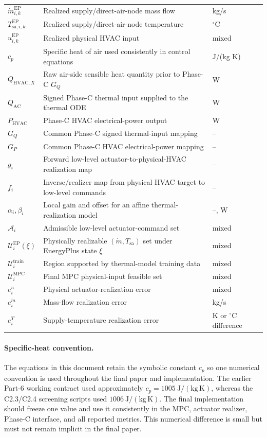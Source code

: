 \documentclass[11pt]{article}
\newcommand{\mdot}{\dot m}
\newcommand{\Qx}{Q_{\mathrm{HVAC},X}}
\newcommand{\Qac}{Q_{\mathrm{AC}}}
\newcommand{\Phvac}{P_{\mathrm{HVAC}}}
\begin{document}
\begin{longtable}{>{\raggedright\arraybackslash}p{}
                  >{\raggedright\arraybackslash}p{}
                  >{\raggedright\arraybackslash}p{}}
$\mdot_{i,k}^{\mathrm{EP}}$ & Realized supply/direct-air-node mass flow & kg/s \\
$T_{\mathrm{sa},i,k}^{\mathrm{EP}}$ & Realized supply/direct-air-node temperature & $^\circ$C \\
$u_{i,k}^{\mathrm{EP}}$ & Realized physical HVAC input & mixed \\
$c_p$ & Specific heat of air used consistently in control equations & J/(kg K) \\
$\Qx$ & Raw air-side sensible heat quantity prior to Phase-C $G_Q$ & W \\
$\Qac$ & Signed Phase-C thermal input supplied to the thermal ODE & W \\
$\Phvac$ & Phase-C HVAC electrical-power output & W \\
$G_Q$ & Common Phase-C signed thermal-input mapping & -- \\
$G_P$ & Common Phase-C HVAC electrical-power mapping & -- \\
$g_i$ & Forward low-level actuator-to-physical-HVAC realization map & -- \\
$f_i$ & Inverse/realizer map from physical HVAC target to low-level commands & -- \\
$\alpha_i,\beta_i$ & Local gain and offset for an affine thermal-realization model & --, W \\
$\mathcal A_i$ & Admissible low-level actuator-command set & mixed \\
$\mathcal U_i^{\mathrm{EP}}(\xi)$ & Physically realizable $(\mdot,T_{\mathrm{sa}})$ set under EnergyPlus state $\xi$ & mixed \\
$\mathcal U_i^{\mathrm{train}}$ & Region supported by thermal-model training data & mixed \\
$\mathcal U_i^{\mathrm{MPC}}$ & Final MPC physical-input feasible set & mixed \\
$e^u_i$ & Physical actuator-realization error & mixed \\
$e_i^{\mdot}$ & Mass-flow realization error & kg/s \\
$e_i^T$ & Supply-temperature realization error & K or $^\circ$C difference \\
\bottomrule
\end{longtable}

\paragraph{Specific-heat convention.}
The equations in this document retain the symbolic constant $c_p$ so one
numerical convention is used throughout the final paper and implementation.
The earlier Part-6 working contract used approximately
$c_p=1005~\mathrm{J/(kg\,K)}$, whereas the C2.3/C2.4 screening scripts used
$1006~\mathrm{J/(kg\,K)}$.  The final implementation should freeze one value
and use it consistently in the MPC, actuator realizer, Phase-C interface, and
all reported metrics.  This numerical difference is small but must not remain
implicit in the final paper.
\end{document}
